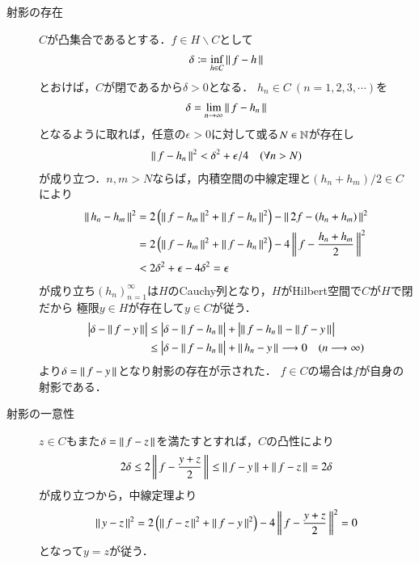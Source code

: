 \begin{prf}\mbox{}
	\begin{description}
	\item[射影の存在]
	$C$が凸集合であるとする．$f \in H \backslash C$として
	\begin{align}
		\delta \coloneqq \operatorname*{inf}_{h \in C} \left\|\, f - h\, \right\|_{}
	\end{align}
	とおけば，$C$が閉であるから$\delta > 0$となる．
	$h_n \in C\ (n = 1,2,3,\cdots)$を
	\begin{align}
		\delta = \lim_{n \to \infty}\left\|\, f - h_n\, \right\|_{}
	\end{align}
	となるように取れば，任意の$\epsilon > 0$に対して或る$N \in \mathbb{N}$が存在し
	\begin{align}
		\left\|\, f - h_n\, \right\|_{}^2 < \delta^2 + \epsilon/4 \quad (\forall n > N)
	\end{align}
	が成り立つ．$n,m > N$ならば，内積空間の中線定理と$(h_n + h_m)/2 \in C$により
	\begin{align}
		\left\|\, h_n - h_m\, \right\|_{}^2 &= 2\left( \left\|\, f - h_m\, \right\|_{}^2 + \left\|\, f - h_n\, \right\|_{}^2 \right) - \left\|\, 2f - (h_n + h_m)\, \right\|_{}^2 \\
		&= 2\left( \left\|\, f - h_m\, \right\|_{}^2 + \left\|\, f - h_n\, \right\|_{}^2 \right) - 4\left\|\, f - \frac{h_n + h_m}{2}\, \right\|_{}^2 \\
		&< 2\delta^2 + \epsilon - 4\delta^2 = \epsilon
	\end{align}
	が成り立ち$(h_n)_{n=1}^{\infty}$は$H$のCauchy列となり，$H$がHilbert空間で$C$が$H$で閉だから
	極限$y \in H$が存在して$y \in C$が従う．
	\begin{align}
		\left| \delta - \left\|\, f - y\, \right\|_{} \right| 
		&\leq \left| \delta - \left\|\, f - h_n\, \right\|_{} \right| + \left| \left\|\, f - h_n\, \right\|_{} - \left\|\, f - y\, \right\|_{} \right| \\
		&\leq \left| \delta - \left\|\, f - h_n\, \right\|_{} \right| + \left\|\, h_n - y\, \right\|_{}
		\longrightarrow 0 \quad (n \longrightarrow \infty)
	\end{align}
	より$\delta = \left\|\, f - y\, \right\|_{}$となり射影の存在が示された．
	$f \in C$の場合は$f$が自身の射影である．

	\item[射影の一意性]
		$z \in C$もまた$\delta = \left\|\, f - z\, \right\|_{}$を満たすとすれば，$C$の凸性により
		\begin{align}
			2 \delta \leq 2\left\|\, f - \frac{y + z}{2}\, \right\|_{} \leq \left\|\, f - y\, \right\|_{} + \left\|\, f - z\, \right\|_{} = 2\delta
		\end{align}
		が成り立つから，中線定理より
		\begin{align}
			\left\|\, y - z\, \right\|_{}^2 = 2\left( \left\|\, f - z\, \right\|_{}^2 + \left\|\, f - y\, \right\|_{}^2 \right) - 4\left\|\, f - \frac{y + z}{2}\, \right\|_{}^2 = 0
		\end{align}
		となって$y = z$が従う．
	

\end{description}
\end{prf}
